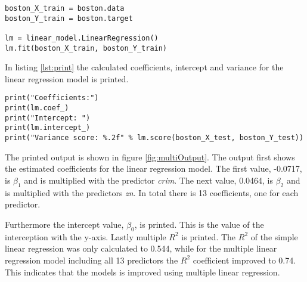 \begin{lstlisting}[caption={Linear Regression of multiple predictors}, label=lst:mul_lin_reg, mathescape=true]
boston_X_train = boston.data
boston_Y_train = boston.target

lm = linear_model.LinearRegression()
lm.fit(boston_X_train, boston_Y_train)
\end{lstlisting}

In listing \ref{lst:print} the calculated coefficients, intercept and variance for the linear regression model is printed.

\begin{lstlisting}[caption={Printing regression overview}, label=lst:print, mathescape=true]
print("Coefficients:")
print(lm.coef_)
print("Intercept: ")
print(lm.intercept_)
print("Variance score: %.2f" % lm.score(boston_X_test, boston_Y_test))
\end{lstlisting}

The printed output is shown in figure \ref{fig:multiOutput}. The output first shows the estimated coefficients for the linear regression model. The first value, -0.0717, is $\beta_1$ and is multiplied with the predictor \emph{crim}. The next value, 0.0464, is $\beta_2$ and is multiplied with the predictors \emph{zn}. In total there is 13 coefficients, one for each predictor.

Furthermore the intercept value, $\beta_0$, is printed. This is the value of the interception with the y-axis. Lastly multiple $R^2$ is printed. The $R^2$ of the simple linear regression was only calculated to 0.544, while for the multiple linear regression model including all 13 predictors the $R^2$ coefficient improved to 0.74. This indicates that the models is improved using multiple linear regression.



